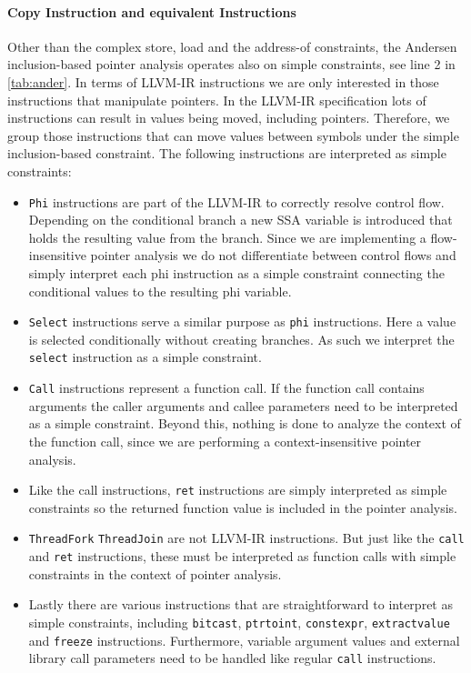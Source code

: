 \paragraph{Copy Instruction and equivalent Instructions}
Other than the complex store, load and the address-of constraints, the Andersen inclusion-based pointer analysis operates also on simple constraints, see line 2 in \autoref{tab:ander}. In terms of LLVM-IR instructions we are only interested in those instructions that manipulate pointers. In the LLVM-IR specification lots of instructions can result in values being moved, including pointers. Therefore, we group those instructions that can move values between symbols under the simple inclusion-based constraint.
The following instructions are interpreted as simple constraints:
\begin{itemize}
    \item \verb|Phi| instructions are part of the LLVM-IR to correctly resolve control flow. Depending on the conditional branch a new SSA variable is introduced that holds the resulting value from the branch.
          Since we are implementing a flow-insensitive pointer analysis we do not differentiate between control flows and simply interpret each phi instruction as a simple constraint connecting the conditional values to the resulting phi variable.
    \item \verb|Select| instructions serve a similar purpose as \verb|phi| instructions. Here a value is selected conditionally without creating branches. As such we interpret the \verb|select| instruction as a simple constraint.
    \item \verb|Call| instructions represent a function call. If the function call contains arguments the caller arguments and callee parameters need to be interpreted as a simple constraint. Beyond this, nothing is done to analyze the context of the function call, since we are performing a context-insensitive pointer analysis.
    \item Like the call instructions, \verb|ret| instructions are simply interpreted as simple constraints so the returned function value is included in the pointer analysis.
    \item \verb|ThreadFork| \verb|ThreadJoin| are not LLVM-IR instructions. But just like the \verb|call| and \verb|ret| instructions, these must be interpreted as function calls with simple constraints in the context of pointer analysis.
    \item Lastly there are various instructions that are straightforward to interpret as simple constraints, including \verb|bitcast|, \verb|ptrtoint|, \verb|constexpr|, \verb|extractvalue| and \verb|freeze| instructions. Furthermore, variable argument values and external library call parameters need to be handled like regular \verb|call| instructions.
\end{itemize}

